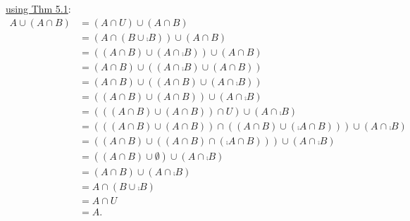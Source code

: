 \documentclass[12pt]{book}
\begin{document}
\begin{enumerate}
{\begin{enumerate}
\underline{using Thm 5.1}: \begin{align*}A \cup (A \cap B) &= (A \cap U) \cup (A \cap B)\tag{5.1.4'}\\&= (A \cap (B \cup \comp{B})) \cup (A \cap B)\tag{5.1.5}\\&= ((A \cap B) \cup (A \cap \comp{B})) \cup (A \cap B)\tag{5.1.3'}\\&= (A \cap B) \cup ((A \cap \comp{B}) \cup (A \cap B))\tag{5.1.1}\\&= (A \cap B) \cup ((A \cap B) \cup (A \cap \comp{B}))\tag{5.1.2}\\&= ((A \cap B) \cup (A \cap B)) \cup (A \cap \comp{B})\tag{5.1.1}\\&= (((A \cap B) \cup (A \cap B)) \cap U) \cup (A \cap \comp{B})\tag{5.1.4'}\\&=  (((A \cap B) \cup (A \cap B)) \cap ((A \cap B) \cup (\comp{A \cap B}))) \cup (A \cap \comp{B})\tag{5.1.5}\\&= ((A \cap B) \cup ((A \cap B) \cap (\comp{A \cap B}))) \cup (A \cap \comp{B})\tag{5.1.3}\\&= ((A \cap B) \cup \emptyset) \cup (A \cap \comp{B})\tag{5.1.5'}\\&= (A \cap B) \cup (A \cap \comp{B})\tag{5.1.4}\\&= A \cap (B \cup \comp{B})\tag{5.1.3'}\\&= A \cap U\tag{5.1.5}\\&= A.\tag{5.1.4'}\end{align*}
\end{enumerate}}


\end{enumerate}
\end{document}

